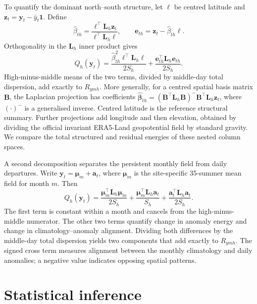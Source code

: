 \documentclass[namedate,webpdf,modern,mediumone]{oup-authoring-template}
\begin{document}
To quantify the dominant north--south structure, let $\boldsymbol\ell$ be
centred latitude and $\mathbf z_t=\mathbf y_t-\bar y_t\mathbf 1$. Define
\[
 \widehat\beta_{th}=
 \frac{\boldsymbol\ell^\top\mathbf L_h\mathbf z_t}
      {\boldsymbol\ell^\top\mathbf L_h\boldsymbol\ell},
 \qquad
 \mathbf e_{th}=\mathbf z_t-\widehat\beta_{th}\boldsymbol\ell.
\]
Orthogonality in the $\mathbf L_h$ inner product gives
\begin{equation}
 Q_h(\mathbf y_t)=
 \frac{\widehat\beta_{th}^2\boldsymbol\ell^\top\mathbf L_h\boldsymbol\ell}
      {2S_h}
 +\frac{\mathbf e_{th}^\top\mathbf L_h\mathbf e_{th}}{2S_h}.
 \label{eq:gradient-decomposition}
\end{equation}
High-minus-middle means of the two terms, divided by middle-day total
dispersion, add exactly to $R_{ymh}$. More generally,
for a centred spatial basis matrix $\mathbf B$, the Laplacian projection has
coefficients $\widehat{\boldsymbol\beta}_{th}=
(\mathbf B^\top\mathbf L_h\mathbf B)^{-}\mathbf B^\top\mathbf L_h\mathbf z_t$,
where $(\cdot)^{-}$ is a generalised inverse. Centred latitude is the
reference structural summary. Further projections add longitude and then
elevation, obtained by dividing the official invariant ERA5-Land geopotential
field by standard gravity. We compare the total structured and residual
energies of these nested column spaces.

A second decomposition separates the persistent monthly field from daily
departures. Write
$\mathbf y_t=\boldsymbol\mu_m+\mathbf a_t$, where $\boldsymbol\mu_m$ is the
site-specific 35-summer mean field for month $m$. Then
\begin{equation}
 Q_h(\mathbf y_t)=
 \frac{\boldsymbol\mu_m^\top\mathbf L_h\boldsymbol\mu_m}{2S_h}
 +\frac{\boldsymbol\mu_m^\top\mathbf L_h\mathbf a_t}{S_h}
 +\frac{\mathbf a_t^\top\mathbf L_h\mathbf a_t}{2S_h}.
 \label{eq:climatology-anomaly}
\end{equation}
The first term is constant within a month and cancels from the high-minus-middle
numerator. The other two terms quantify change in anomaly energy and change in
climatology--anomaly alignment. Dividing both differences by the middle-day
total dispersion yields two components that add exactly to $R_{ymh}$.
The signed cross term measures alignment between the monthly climatology
and daily anomalies; a negative value indicates opposing spatial patterns.

\section{Statistical inference}
\end{document}
